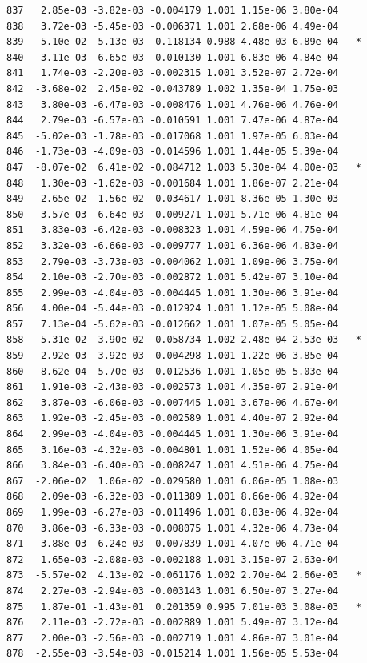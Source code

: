 \documentclass[
  letterpaper,
  DIV=11,
  numbers=noendperiod]{scrartcl}
\begin{document}
\begin{verbatim}
837   2.85e-03 -3.82e-03 -0.004179 1.001 1.15e-06 3.80e-04    
838   3.72e-03 -5.45e-03 -0.006371 1.001 2.68e-06 4.49e-04    
839   5.10e-02 -5.13e-03  0.118134 0.988 4.48e-03 6.89e-04   *
840   3.11e-03 -6.65e-03 -0.010130 1.001 6.83e-06 4.84e-04    
841   1.74e-03 -2.20e-03 -0.002315 1.001 3.52e-07 2.72e-04    
842  -3.68e-02  2.45e-02 -0.043789 1.002 1.35e-04 1.75e-03    
843   3.80e-03 -6.47e-03 -0.008476 1.001 4.76e-06 4.76e-04    
844   2.79e-03 -6.57e-03 -0.010591 1.001 7.47e-06 4.87e-04    
845  -5.02e-03 -1.78e-03 -0.017068 1.001 1.97e-05 6.03e-04    
846  -1.73e-03 -4.09e-03 -0.014596 1.001 1.44e-05 5.39e-04    
847  -8.07e-02  6.41e-02 -0.084712 1.003 5.30e-04 4.00e-03   *
848   1.30e-03 -1.62e-03 -0.001684 1.001 1.86e-07 2.21e-04    
849  -2.65e-02  1.56e-02 -0.034617 1.001 8.36e-05 1.30e-03    
850   3.57e-03 -6.64e-03 -0.009271 1.001 5.71e-06 4.81e-04    
851   3.83e-03 -6.42e-03 -0.008323 1.001 4.59e-06 4.75e-04    
852   3.32e-03 -6.66e-03 -0.009777 1.001 6.36e-06 4.83e-04    
853   2.79e-03 -3.73e-03 -0.004062 1.001 1.09e-06 3.75e-04    
854   2.10e-03 -2.70e-03 -0.002872 1.001 5.42e-07 3.10e-04    
855   2.99e-03 -4.04e-03 -0.004445 1.001 1.30e-06 3.91e-04    
856   4.00e-04 -5.44e-03 -0.012924 1.001 1.12e-05 5.08e-04    
857   7.13e-04 -5.62e-03 -0.012662 1.001 1.07e-05 5.05e-04    
858  -5.31e-02  3.90e-02 -0.058734 1.002 2.48e-04 2.53e-03   *
859   2.92e-03 -3.92e-03 -0.004298 1.001 1.22e-06 3.85e-04    
860   8.62e-04 -5.70e-03 -0.012536 1.001 1.05e-05 5.03e-04    
861   1.91e-03 -2.43e-03 -0.002573 1.001 4.35e-07 2.91e-04    
862   3.87e-03 -6.06e-03 -0.007445 1.001 3.67e-06 4.67e-04    
863   1.92e-03 -2.45e-03 -0.002589 1.001 4.40e-07 2.92e-04    
864   2.99e-03 -4.04e-03 -0.004445 1.001 1.30e-06 3.91e-04    
865   3.16e-03 -4.32e-03 -0.004801 1.001 1.52e-06 4.05e-04    
866   3.84e-03 -6.40e-03 -0.008247 1.001 4.51e-06 4.75e-04    
867  -2.06e-02  1.06e-02 -0.029580 1.001 6.06e-05 1.08e-03    
868   2.09e-03 -6.32e-03 -0.011389 1.001 8.66e-06 4.92e-04    
869   1.99e-03 -6.27e-03 -0.011496 1.001 8.83e-06 4.92e-04    
870   3.86e-03 -6.33e-03 -0.008075 1.001 4.32e-06 4.73e-04    
871   3.88e-03 -6.24e-03 -0.007839 1.001 4.07e-06 4.71e-04    
872   1.65e-03 -2.08e-03 -0.002188 1.001 3.15e-07 2.63e-04    
873  -5.57e-02  4.13e-02 -0.061176 1.002 2.70e-04 2.66e-03   *
874   2.27e-03 -2.94e-03 -0.003143 1.001 6.50e-07 3.27e-04    
875   1.87e-01 -1.43e-01  0.201359 0.995 7.01e-03 3.08e-03   *
876   2.11e-03 -2.72e-03 -0.002889 1.001 5.49e-07 3.12e-04    
877   2.00e-03 -2.56e-03 -0.002719 1.001 4.86e-07 3.01e-04    
878  -2.55e-03 -3.54e-03 -0.015214 1.001 1.56e-05 5.53e-04    

\end{verbatim}
\end{document}
